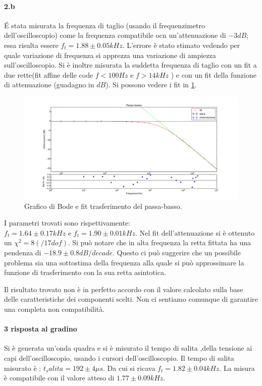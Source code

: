 \documentclass[10pt,a4paper]{article}
\begin{document}
\paragraph{2.b}
\'E stata misurata la frequenza di taglio (usando il frequenzimetro dell'oscilloscopio) come la frequenza compatibile ocn un'attenuazione di $-3dB$; essa risulta essere $f_t =1.88 \pm 0.05 kHz$. L'errore è stato stimato vedendo per quale variazione di frequenza si apprezza una variazione di ampiezza sull'oscilloscopio.
Si è inoltre misurata la suddetta frequenza di taglio con un fit a due rette(fit affine delle code $f<100 Hz$ e $f>14 kHz$  ) e con un fit della funzione di attenuazione (guadagno in $dB$). 
Si possono vedere i fit in \ref{f:fit1}. 
\begin{figure}
	\centering
	\includegraphics[scale=0.4]{plt_passa_basso.pdf}
	\caption{Grafico di Bode e fit trasferimento del passa-basso.\label{f:fit1}}
\end{figure}

I parametri trovati sono rispettivamente:\\
$f_t=1.64\pm 0.17 kHz$ e $f_t=1.90 \pm 0.01 kHz$. Nel fit dell'attenuazione si è ottenuto un $\chi^2=8 (/17 dof)$.
Si può notare che in alta frequenza la retta fittata ha una pendenza di $-18.9\pm 0.8 dB/decade$. Questo ci può suggerire che un possibile problema sia una sottostima della frequenza alla quale si può approssimare la funzione di trasferimento con la sua retta asintotica.

Il risultato trovato non è in perfetto accordo con il valore calcolato sulla base delle caratteristiche dei componenti scelti. Non ci sentiamo comunque di garantire una completa non compatibilità.


\paragraph{3 risposta al gradino }
Si è generata un'onda quadra e si è misurato il tempo di salita ,della tensione ai capi dell'oscilloscopio, usando i cursori dell'oscilloscopio. Il tempo di salita misurato è : $t_salita = 192 \pm 4 \mu s$.
Da cui si ricava $f_t = 1.82 \pm 0.04 kHz $. La misura è compatibile con il valore atteso di $1.77 \pm 0.09 kHz $.
\end{document}
